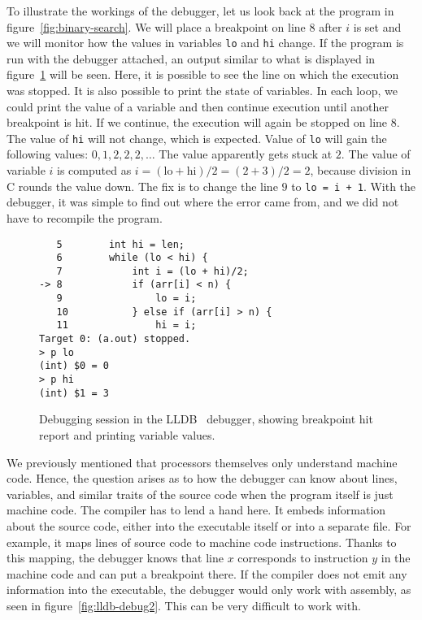 To illustrate the workings of the debugger, let us look back at the program in
figure~\ref{fig:binary-search}. We will place a breakpoint on line $8$ after
$i$ is set and we will monitor how the values in variables \texttt{lo} and
\texttt{hi} change. If the program is run with the debugger attached, an output
similar to what is displayed in figure~\ref{fig:lldb-debug1} will be seen.
Here, it is possible to see the line on which the execution was stopped. It is
also possible to print the state of variables. In each loop, we could print the
value of a variable and then continue execution until another breakpoint is
hit. If we continue, the execution will again be stopped on line $8$. The value
of \texttt{hi} will not change, which is expected. Value of \texttt{lo} will
gain the following values: $0, 1, 2, 2, 2, \dots$ The value apparently gets
stuck at $2$. The value of variable $i$ is computed as $i = (\text{lo} +
\text{hi})/2 = (2 + 3)/2 = 2$, because division in C rounds the value down. The
fix is to change the line $9$ to \texttt{lo = i + 1}. With the debugger, it was
simple to find out where the error came from, and we did not have to recompile
the program.

\begin{figure}
\begin{verbatim}
   5   	    int hi = len;
   6   	    while (lo < hi) {
   7   	        int i = (lo + hi)/2;
-> 8   	        if (arr[i] < n) {
   9   	            lo = i;
   10  	        } else if (arr[i] > n) {
   11  	            hi = i;
Target 0: (a.out) stopped.
> p lo
(int) $0 = 0
> p hi
(int) $1 = 3
\end{verbatim}
    \caption{Debugging session in the LLDB~\cite{lldb} debugger, showing
    breakpoint hit report and printing variable values.}
    \label{fig:lldb-debug1}
\end{figure}

We previously mentioned that processors themselves only understand machine
code. Hence, the question arises as to how the debugger can know about lines,
variables, and similar traits of the source code when the program itself is
just machine code. The compiler has to lend a hand here. It embeds information
about the source code, either into the executable itself or into a separate
file. For example, it maps lines of source code to machine code instructions.
Thanks to this mapping, the debugger knows that line $x$ corresponds to
instruction $y$ in the machine code and can put a breakpoint there. If the
compiler does not emit any information into the executable, the debugger would
only work with assembly, as seen in figure~\ref{fig:lldb-debug2}. This can be
very difficult to work with.

